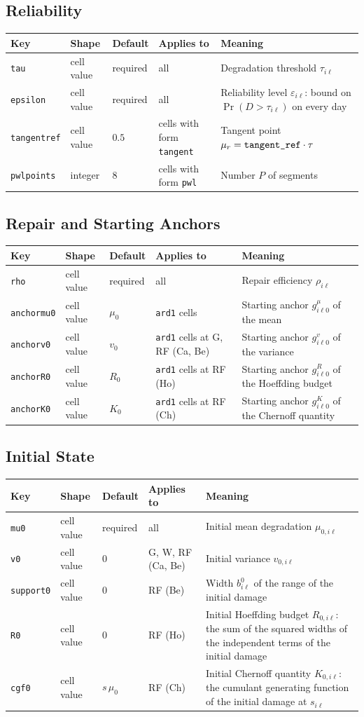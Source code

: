 \documentclass[11pt,a4paper]{article}
\makeatletter
\theoremstyle{plain}
\theoremstyle{definition}
\renewcommand{\_}{\textunderscore\allowbreak{}}
\providecommand{\keyrow}[5]{{\raggedright #1\par} & {\raggedright #2\par} & {\raggedright #3\par} & {\raggedright #4\par} & {\raggedright #5\par} \\}
\providecommand{\tabstart}[2]{\begingroup\small\begin{longtable}{@{}#1@{}}\toprule #2 \\ \midrule \endhead}
\providecommand{\tabend}{\bottomrule\end{longtable}\endgroup}
\providecommand{\keytab}{\tabstart{p{3.2cm}p{2.2cm}p{1.8cm}p{1.9cm}p{4.5cm}}{Key & Shape & Default & Applies to & Meaning}}
\makeatother
\begin{document}
\subsection{Reliability}\label{sec:input_reliability}

\keytab
\keyrow{\texttt{tau}}{cell value}{required}{all}{Degradation threshold $\tau_{i\ell}$}
\keyrow{\texttt{epsilon}}{cell value}{required}{all}{Reliability level $\varepsilon_{i\ell}$: bound on $\Pr(D > \tau_{i\ell})$ on every day}
\keyrow{\texttt{tangent\_ref}}{cell value}{$0.5$}{cells with form \texttt{tangent}}{Tangent point $\mu_r = \texttt{tangent\_ref}\cdot\tau$}
\keyrow{\texttt{pwl\_points}}{integer}{$8$}{cells with form \texttt{pwl}}{Number $P$ of segments}
\tabend

\subsection{Repair and Starting Anchors}\label{sec:input_repair}

\keytab
\keyrow{\texttt{rho}}{cell value}{required}{all}{Repair efficiency $\rho_{i\ell}$}
\keyrow{\texttt{anchor\_mu\_0}}{cell value}{$\mu_0$}{\texttt{ard1} cells}{Starting anchor $g^{\mu}_{i\ell 0}$ of the mean}
\keyrow{\texttt{anchor\_v\_0}}{cell value}{$v_0$}{\texttt{ard1} cells at G, RF (Ca, Be)}{Starting anchor $g^{v}_{i\ell 0}$ of the variance}
\keyrow{\texttt{anchor\_R\_0}}{cell value}{$R_0$}{\texttt{ard1} cells at RF (Ho)}{Starting anchor $g^{R}_{i\ell 0}$ of the Hoeffding budget}
\keyrow{\texttt{anchor\_K\_0}}{cell value}{$K_0$}{\texttt{ard1} cells at RF (Ch)}{Starting anchor $g^{K}_{i\ell 0}$ of the Chernoff quantity}
\tabend

\subsection{Initial State}\label{sec:input_initial}

\keytab
\keyrow{\texttt{mu\_0}}{cell value}{required}{all}{Initial mean degradation $\mu_{0,i\ell}$}
\keyrow{\texttt{v\_0}}{cell value}{$0$}{G, W, RF (Ca, Be)}{Initial variance $v_{0,i\ell}$}
\keyrow{\texttt{support\_0}}{cell value}{$0$}{RF (Be)}{Width $b^{0}_{i\ell}$ of the range of the initial damage}
\keyrow{\texttt{R\_0}}{cell value}{$0$}{RF (Ho)}{Initial Hoeffding budget $R_{0,i\ell}$: the sum of the squared widths of the independent terms of the initial damage}
\keyrow{\texttt{cgf\_0}}{cell value}{$s\,\mu_0$}{RF (Ch)}{Initial Chernoff quantity $K_{0,i\ell}$: the cumulant generating function of the initial damage at $s_{i\ell}$}
\tabend
\end{document}

